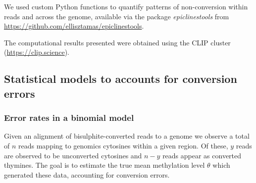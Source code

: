 \documentclass[12pt,longbibliography]{article}
\begin{document}
We used custom Python functions to quantify patterns of non-conversion within reads and across the genome, available via the package \textit{epiclinestools} from \url{https://github.com/ellisztamas/epiclinestools}.

The computational results presented were obtained using the CLIP cluster (\url{https://clip.science}).

\subsection{Statistical models to accounts for conversion errors}

\subsubsection{Error rates in a binomial model} \label{sec:binomial-with-errors}

Given an alignment of bisulphite-converted reads to a genome we observe a total of $n$ reads mapping to genomics cytosines within a given region. Of these, $y$ reads are observed to be unconverted cytosines and $n-y$ reads appear as converted thymines. The goal is to estimate the true mean methylation level $\theta$ which generated these data, accounting for conversion errors.
\end{document}

